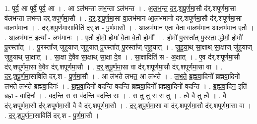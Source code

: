 \documentclass[17pt]{extarticle}
\begin{document}
1. पूर्व॒ आ पूर्वे॒ पूर्व॒ आ । . आ ऽल॑भन्ता लभ॒न्ता ऽल॑भन्त । . अ॒ल॒भ॒न्त॒ द॒र्॒.श॒पू॒र्ण॒मा॒सौ द॑र्.शपूर्णमा॒सा व॑लभन्ता लभन्त दर्.शपूर्णमा॒सौ । . द॒र्॒.श॒पू॒र्ण॒मा॒सा वा॒लभ॑मान आ॒लभ॑मानो दर्.शपूर्णमा॒सौ द॑र्.शपूर्णमा॒सा वा॒लभ॑मानः । . द॒र्॒.श॒पू॒र्ण॒मा॒साविति॑ दर्.श - पू॒र्ण॒मा॒सौ । . आ॒लभ॑मान ए॒ता वे॒ता वा॒लभ॑मान आ॒लभ॑मान ए॒तौ । . आ॒लभ॑मान॒ इत्या᳚ - लभ॑मानः । . ए॒तौ होमौ॒ होमा॑ वे॒ता वे॒तौ होमौ᳚ । . होमौ॑ पु॒रस्ता᳚त् पु॒रस्ता॒ द्धोमौ॒ होमौ॑ पु॒रस्ता᳚त् । . पु॒रस्ता᳚ज् जुहुयाज् जुहुयात् पु॒रस्ता᳚त् पु॒रस्ता᳚ज् जुहुयात् । . जु॒हु॒या॒थ् सा॒क्षाथ् सा॒क्षाज् जु॑हुयाज् जुहुयाथ् सा॒क्षात् । . सा॒क्षा दे॒वैव सा॒क्षाथ् सा॒क्षा दे॒व । . सा॒क्षादिति॑ स - अ॒क्षात् । . ए॒व द॑र्.शपूर्णमा॒सौ द॑र्.शपूर्णमा॒सा वे॒वैव द॑र्.शपूर्णमा॒सौ । . द॒र्॒.श॒पू॒र्ण॒मा॒सा वा द॑र्.शपूर्णमा॒सौ द॑र्.शपूर्णमा॒सा वा । . द॒र्॒.श॒पू॒र्ण॒मा॒साविति॑ दर्.श - पू॒र्ण॒मा॒सौ । . आ ल॑भते लभत॒ आ ल॑भते । . ल॒भ॒ते॒ ब्र॒ह्म॒वा॒दिनो᳚ ब्रह्मवा॒दिनो॑ लभते लभते ब्रह्मवा॒दिनः॑ । . ब्र॒ह्म॒वा॒दिनो॑ वदन्ति वदन्ति ब्रह्मवा॒दिनो᳚ ब्रह्मवा॒दिनो॑ वदन्ति । . ब्र॒ह्म॒वा॒दिन॒ इति॑ ब्रह्म - वा॒दिनः॑ । . व॒द॒न्ति॒ स स व॑दन्ति वदन्ति॒ सः । . स तु तु स स तु । . त्वै वै तु त्वै । . वै द॑र्.शपूर्णमा॒सौ द॑र्.शपूर्णमा॒सौ वै वै द॑र्.शपूर्णमा॒सौ । . द॒र्॒.श॒पू॒र्ण॒मा॒सा वा द॑र्.शपूर्णमा॒सौ द॑र्.शपूर्णमा॒सा वा । . द॒र्॒.श॒पू॒र्ण॒मा॒साविति॑ दर्.श - पू॒र्ण॒मा॒सौ । \newline
\end{document}
